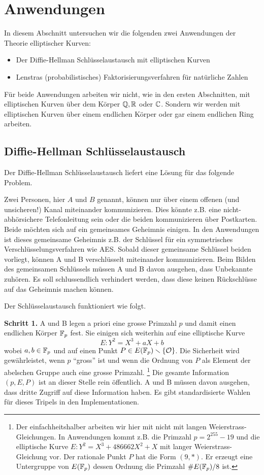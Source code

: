\chapter{Anwendungen}

In diesem Abschnitt untersuchen wir die folgenden
zwei Anwendungen der Theorie
elliptischer Kurven:

\begin{itemize}
\item Der Diffie-Hellman Schlüsselaustausch mit elliptischen Kurven
\item Lenstras (probabilistisches)
  Faktorisierungsverfahren für natürliche Zahlen
\end{itemize}

Für beide Anwendungen arbeiten wir nicht, wie in den ersten
Abschnitten, mit elliptischen Kurven über dem Körper ${\mathbb{Q}},{\mathbb{R}}$ oder
${\mathbb{C}}$. Sondern wir werden mit elliptischen Kurven über einem endlichen
Körper oder gar einem endlichen Ring arbeiten. 

\section{Diffie-Hellman Schlüsselaustausch}

Der Diffie-Hellman Schlüsselaustausch liefert eine Lösung für das
folgende Problem.

Zwei Personen, hier $A$ und $B$ genannt, können nur über einem offenen
(und unsicheren!)
Kanal miteinander kommunizieren. Dies könnte z.B. eine
nicht-abhörsichere Telefonleitung sein oder die beiden kommunizieren
über Postkarten. Beide möchten sich auf ein gemeinsames Geheimnis
einigen. In den Anwendungen ist dieses gemeinsame Geheimnis z.B. der
Schlüssel für ein symmetrisches Verschlüsselungsverfahren wie 
AES. Sobald dieser gemeinsame Schlüssel beiden vorliegt, können A
und B  verschlüsselt miteinander kommunizieren. Beim
Bilden des gemeinsamen Schlüssels müssen A und B davon ausgehen, dass
Unbekannte zuhören. Es soll schlussendlich verhindert werden, dass
diese keinen Rückschlüsse auf das Geheimnis machen können.

Der Schlüsselaustausch funktioniert wie folgt.

\bigskip
\textbf{Schritt 1.} A und B legen a priori 
eine grosse Primzahl $p$ und damit einen endlichen Körper ${\mathbb{F}}_p$ fest.
Sie einigen sich weiterhin auf eine elliptische Kurve
$$E: Y^2 = X^3+aX+b$$
wobei $a,b\in{\mathbb{F}}_p$ und auf einen Punkt $P\in
E({\mathbb{F}}_p)\smallsetminus\{{\mathcal O}\}$. Die Sicherheit wird gewährleistet, wenn $p$
``gross'' ist und wenn die Ordnung von $P$ als Element der abelschen
Gruppe auch eine grosse  Primzahl.  
\footnote{Der einfachheitshalber arbeiten wir hier
  mit nicht mit langen Weierstrass-Gleichungen. In Anwendungen kommt
  z.B. die Primzahl 
 $p = 2^{255}-19$ und die elliptische Kurve
  $E: Y^2 = X^3+486662X^2+X$ mit langer Weierstrass-Gleichung vor. Der
rationale Punkt $P$ hat die Form $(9,*)$. Er erzeugt eine Untergruppe
von $E({\mathbb{F}}_p)$ dessen Ordnung die Primzahl $\#E({\mathbb{F}}_p)/8$ ist.}
Die gesamte Information $(p,E,P)$ ist an dieser Stelle rein
öffentlich. 
A und B müssen davon ausgehen, dass dritte Zugriff auf
diese Information haben.
Es gibt standardisierte Wahlen für  dieses Tripels in den Implementationen.

